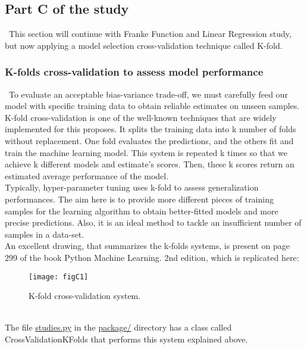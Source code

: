 \subsection{Part C of the study}
\label{chap:Part C of the study}

\quad \, This section will continue with Franke Function and Linear Regression study, but now applying a model selection cross-validation technique called K-fold. \\

\subsubsection{K-folds cross-validation to assess model performance}
\label{chap:K-folds cross-validation to assess model performance}

\quad \, To evaluate an acceptable bias-variance trade-off, we must carefully feed our model with specific training data to obtain reliable estimates on unseen samples. K-fold cross-validation is one of the well-known techniques that are widely implemented for this proposes. It splits the training data into k number of folds without replacement. One fold evaluates the predictions, and the others fit and train the machine learning model. This system is repeated k times so that we achieve k different models and estimate's scores. Then, these k scores return an estimated average performance of the model. \\

Typically, hyper-parameter tuning uses k-fold to assess generalization performances. The aim here is to provide more different pieces of training samples for the learning algorithm to obtain better-fitted models and more precise predictions. Also, it is an ideal method to tackle an insufficient number of samples in a data-set. \\

An excellent drawing, that summarizes the k-folds systems, is present on page 299 of the book Python Machine Learning. 2nd edition, which is replicated here: \\

\begin{figure}[h]
\label{fig:figC1}
\texttt{[image: figC1]}
\caption{K-fold cross-validation system.}
\centering
\end{figure}\\

The file \href{https://github.com/fabiorodp/UiO-FYS-STK4155/blob/master/Project1/package/studies.py}{studies.py} in the \href{https://github.com/fabiorodp/UiO-FYS-STK4155/tree/master/Project1/package}{package/} directory has a class called CrossValidationKFolds that performs this system explained above. \\


